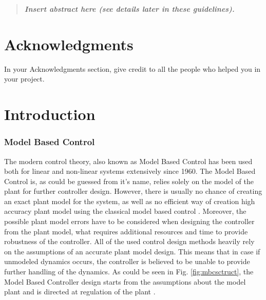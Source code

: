 \documentclass[]{final_report}
\begin{document}
\maketitle

\tableofcontents
\newpage


\begin{abstract}

\textbf{\textsl{Insert abstract here (see details later in these guidelines).}}

\end{abstract}
\newpage


\chapter*{Acknowledgments}

In your Acknowledgments section, give credit to all the people who helped you in your project.


\chapter{Introduction}
\subsection{Model Based Control}

The modern control theory, also known as Model Based Control has been used both for linear and non-linear systems extensively since 1960. The Model Based Control is, as could be guessed from it's name, relies solely on the model of the plant for further controller design. However, there is usually no chance of creating an exact plant model for the system, as well as no efficient way of creation high accuracy plant model using the classical model based control \cite{hou2013model}. Moreover, the possible plant model errors have to be considered when designing the controller from the plant model, what requires additional resources and time to provide robustness of the controller. All of the used control design methods heavily rely on the assumptions of an accurate plant model design. This means that in case if unmodeled dynamics occurs, the controller is believed to be unable to provide further handling of the dynamics. As could be seen in Fig. \ref{fig:mbcsctruct}, the Model Based Controller design starts from the assumptions about the model plant and is directed at regulation of the plant \cite{hou2013model}.
\end{document}
